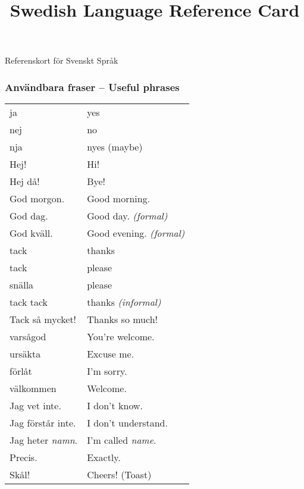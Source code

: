 \documentclass[14pt]{refcard} %
\title{Swedish Language Reference Card}
\begin{document}
\centering

\maketitle
\vspace{-1ex}
Referenskort för Svenskt Språk

\subsubsection{Användbara fraser -- Useful phrases}
\vspace{-1ex}
\begin{tabular}{ll}
ja                     & yes                            \\
nej                    & no                             \\
nja                    & nyes (maybe)                   \\ [1ex]

Hej!                   & Hi!                            \\
Hej då!                & Bye!                           \\
God morgon.            & Good morning.                  \\
God dag.               & Good day. \emph{(formal)}      \\
God kväll.             & Good evening. \emph{(formal)}  \\[1ex]

tack                   & thanks                         \\
tack                   & please                         \\
snälla                 & please                         \\
tack tack              & thanks \emph{(informal)}       \\
Tack så mycket!        & Thanks so much!                \\
varsågod               & You're welcome.                \\
ursäkta                & Excuse me.                     \\
förlåt                 & I'm sorry.                     \\
välkommen              & Welcome.                       \\[1ex]

Jag vet inte.          & I don't know.                  \\
Jag förstår inte.      & I don't understand.            \\
Jag heter \emph{namn}. & I'm called \emph{name}.        \\
Precis.                & Exactly.                       \\[1ex]

Skål!                  & Cheers! (Toast)                \\
\end{tabular}
\end{document}
